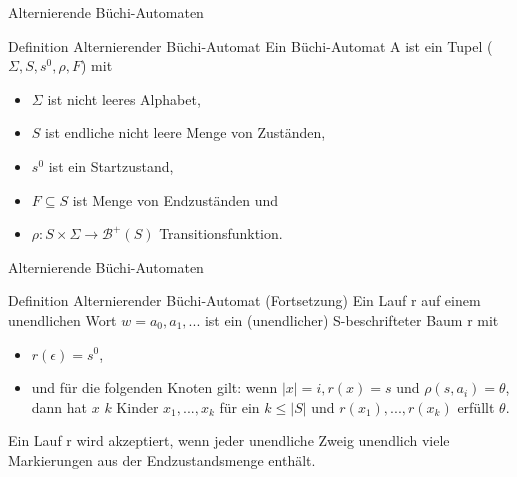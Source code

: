 \begin{frame}{Alternierende Büchi-Automaten}
\begin{block}{Definition Alternierender Büchi-Automat}
Ein Büchi-Automat A ist ein Tupel ($\Sigma, S, s^0, \rho, F$) mit
\begin{itemize}
\item $\Sigma$ ist nicht leeres Alphabet,
\item $S$ ist endliche nicht leere Menge von Zuständen,
\item $s^0$ ist ein Startzustand,
\item $F\subseteq S$ ist Menge von Endzuständen und
\item \textbf{$\rho : S \times \Sigma \rightarrow \mathcal{B}^+(S)$} Transitionsfunktion.
\end{itemize}
\end{block}
\end{frame}

\begin{frame}{Alternierende Büchi-Automaten}
\begin{block}{Definition Alternierender Büchi-Automat (Fortsetzung)}
Ein Lauf r auf einem unendlichen Wort $w=a_0,a_1,...$ ist ein (unendlicher) S-beschrifteter Baum r mit
\begin{itemize}
\item $r(\epsilon)=s^0$,
\item und für die folgenden Knoten gilt: wenn $|x|=i, r(x)=s$ und $\rho(s,a_i)=\theta$, dann hat $x$ $k$ Kinder $x_1,...,x_k$ für ein $k \leq |S|$ und $r(x_1),...,r(x_k)$ erfüllt $\theta$.
\end{itemize}
Ein Lauf r wird akzeptiert, wenn jeder unendliche Zweig unendlich viele Markierungen aus der Endzustandsmenge enthält.
\end{block}
\end{frame}